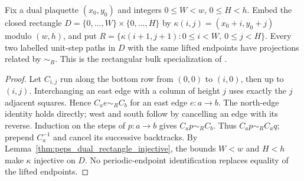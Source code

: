 \begin{lemma}%
    \label{thm:peps_dual_rectangle}
    \leanok
    Fix a dual plaquette $(x_0,y_0)$ and integers $0\leq W<w$,
    $0\leq H<h$. Embed the closed rectangle
    $D=\{0,\ldots,W\}\times\{0,\ldots,H\}$ by
    $\kappa(i,j)=(x_0+i,y_0+j)$ modulo $(w,h)$, and put
    $R=\{\kappa(i+1,j+1):0\leq i<W,\ 0\leq j<H\}$.
    Every two labelled unit-step paths in $D$ with the same lifted
    endpoints have projections related by $\sim_R$.
    This is the rectangular bulk specialization of
    \cite[Lemma~6.14]{Schuch2010PEPS}.
\end{lemma}
\begin{proof}\leanok
    Let $C_{i,j}$ run along the bottom row from $(0,0)$ to $(i,0)$,
    then up to $(i,j)$. Interchanging an east edge with a column of
    height $j$ uses exactly the $j$ adjacent squares. Hence
    $C_a e\sim_R C_b$ for an east edge $e:a\to b$.
    The north-edge identity holds directly; west and south follow
    by cancelling an edge with its reverse. Induction on the steps
    of $p:a\to b$ gives $C_a p\sim_R C_b$.
    Thus $C_a p\sim_R C_a q$; prepend $C_a^{-1}$ and cancel
    its successive backtracks. By
    Lemma~\ref{thm:peps_dual_rectangle_injective}, the bounds $W<w$
    and $H<h$ make $\kappa$ injective on $D$. No periodic-endpoint identification
    replaces equality of the lifted endpoints.
\end{proof}

